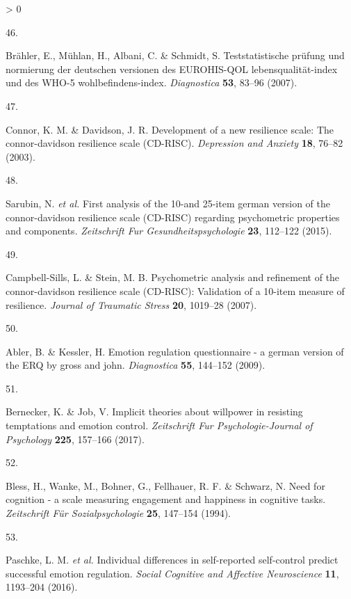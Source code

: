 \documentclass[
  english,
  man,floatsintext]{apa6}
\newlength{\cslhangindent}
\newlength{\csllabelwidth}
\newenvironment{CSLReferences}[2] %
 {%
  \setlength{\parindent}{0pt}
  \ifodd #1 \everypar{\setlength{\hangindent}{\cslhangindent}}\ignorespaces\fi
  \ifnum #2 > 0
  \setlength{\parskip}{#2\baselineskip}
  \fi
 }%
 {}
\newcommand{\CSLLeftMargin}[1]{\parbox[t]{\csllabelwidth}{#1}}
\newcommand{\CSLRightInline}[1]{\parbox[t]{\linewidth - \csllabelwidth}{#1}\break}
\begin{document}
\begin{CSLReferences}{0}{0}
\leavevmode\hypertarget{ref-Braehler2007}{}%
\CSLLeftMargin{46. }
\CSLRightInline{Brähler, E., Mühlan, H., Albani, C. \& Schmidt, S. Teststatistische pr{ü}fung und normierung der deutschen versionen des EUROHIS-QOL lebensqualit{ä}t-index und des WHO-5 wohlbefindens-index. \emph{Diagnostica} \textbf{53}, 83--96 (2007).}

\leavevmode\hypertarget{ref-Connor2003}{}%
\CSLLeftMargin{47. }
\CSLRightInline{Connor, K. M. \& Davidson, J. R. Development of a new resilience scale: The connor-davidson resilience scale (CD-RISC). \emph{Depression and Anxiety} \textbf{18}, 76--82 (2003).}

\leavevmode\hypertarget{ref-Sarubin2015}{}%
\CSLLeftMargin{48. }
\CSLRightInline{Sarubin, N. \emph{et al.} First analysis of the 10-and 25-item german version of the connor-davidson resilience scale (CD-RISC) regarding psychometric properties and components. \emph{Zeitschrift Fur Gesundheitspsychologie} \textbf{23}, 112--122 (2015).}

\leavevmode\hypertarget{ref-Campbell-Sills2007}{}%
\CSLLeftMargin{49. }
\CSLRightInline{Campbell-Sills, L. \& Stein, M. B. Psychometric analysis and refinement of the connor-davidson resilience scale (CD-RISC): Validation of a 10-item measure of resilience. \emph{Journal of Traumatic Stress} \textbf{20}, 1019--28 (2007).}

\leavevmode\hypertarget{ref-Abler2009}{}%
\CSLLeftMargin{50. }
\CSLRightInline{Abler, B. \& Kessler, H. Emotion regulation questionnaire - a german version of the ERQ by gross and john. \emph{Diagnostica} \textbf{55}, 144--152 (2009).}

\leavevmode\hypertarget{ref-Bernecker2017}{}%
\CSLLeftMargin{51. }
\CSLRightInline{Bernecker, K. \& Job, V. Implicit theories about willpower in resisting temptations and emotion control. \emph{Zeitschrift Fur Psychologie-Journal of Psychology} \textbf{225}, 157--166 (2017).}

\leavevmode\hypertarget{ref-Bless1994}{}%
\CSLLeftMargin{52. }
\CSLRightInline{Bless, H., Wanke, M., Bohner, G., Fellhauer, R. F. \& Schwarz, N. Need for cognition - a scale measuring engagement and happiness in cognitive tasks. \emph{Zeitschrift Für Sozialpsychologie} \textbf{25}, 147--154 (1994).}

\leavevmode\hypertarget{ref-Paschke2016}{}%
\CSLLeftMargin{53. }
\CSLRightInline{Paschke, L. M. \emph{et al.} Individual differences in self-reported self-control predict successful emotion regulation. \emph{Social Cognitive and Affective Neuroscience} \textbf{11}, 1193--204 (2016).}


\end{CSLReferences}
\end{document}
